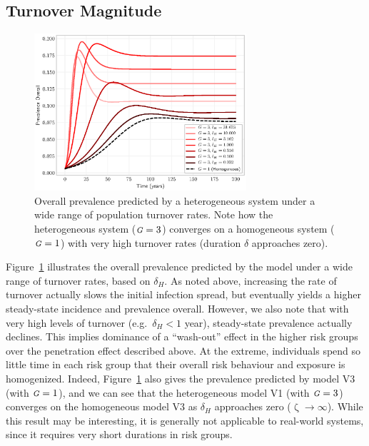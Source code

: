 \documentclass[10pt]{article}
\numberwithin{equation}{section}
\renewcommand{\zeta}{\upzeta}
\newcommand{\G}{{\mbox{\footnotesize{\textit{G}}}}}
\newcommand{\fig}[1]{Figure~\ref{#1}}
\begin{document}
\subsection{Turnover Magnitude}\label{ss:rd-zeta-mag}
\begin{figure}
  \centering\includegraphics[width=0.7\textwidth]{vary-zeta-prev-full.eps}
  \caption{Overall prevalence predicted by a heterogeneous system
    under a wide range of population turnover rates.
    Note how the heterogeneous system ($\G = 3$) converges on a homogeneous system ($\G = 1$)
    with very high turnover rates (duration $\delta$ approaches zero).}
  \label{fig:zeta-mag}
\end{figure}
\fig{fig:zeta-mag} illustrates
the overall prevalence predicted by the model
under a wide range of turnover rates, based on $\delta_H$.
As noted above, increasing the rate of turnover
actually slows the initial infection spread,
but eventually yields a higher steady-state incidence and prevalence overall.
However, we also note that with very high levels of turnover (e.g.\ $\delta_H < 1$ year),
steady-state prevalence actually declines.
This implies dominance of a ``wash-out'' effect in the higher risk groups
over the penetration effect described above.
At the extreme, individuals spend so little time in each risk group
that their overall risk behaviour and exposure is homogenized.
Indeed, \fig{fig:zeta-mag} also gives the prevalence predicted by model V3 (with $\G = 1$),
and we can see that the heterogeneous model V1 (with $\G = 3$)
converges on the homogeneous model V3
as $\delta_H$ approaches zero ($\zeta \rightarrow \infty$).
While this result may be interesting,
it is generally not applicable to real-world systems,
since it requires very short durations in risk groups.
\end{document}
